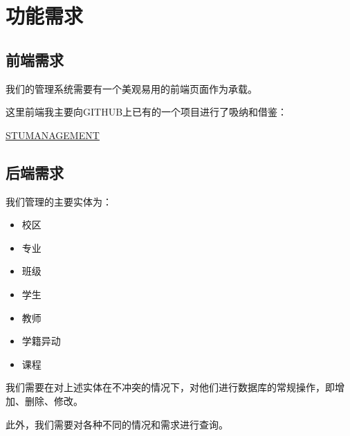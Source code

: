 \documentclass[../report.tex]{subfiles}
\begin{document}
\section {功能需求}

\subsection {前端需求}
我们的管理系统需要有一个美观易用的前端页面作为承载。

这里前端我主要向GITHUB上已有的一个项目进行了吸纳和借鉴：

\href{https://github.com/Soarkey/StudentManagement}{\underline{STUMANAGEMENT}}

\subsection {后端需求}
我们管理的主要实体为：

\begin{itemize}
\itemsep -0.3em
\item 校区
\item 专业
\item 班级
\item 学生
\item 教师
\item 学籍异动
\item 课程
\end{itemize}

我们需要在对上述实体在不冲突的情况下，对他们进行数据库的常规操作，即增加、删除、修改。

此外，我们需要对各种不同的情况和需求进行查询。
\end{document}

